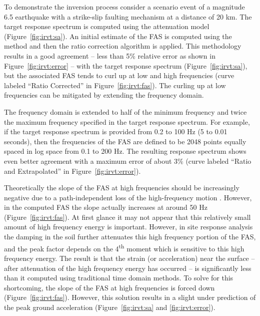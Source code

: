 \documentclass[12pt,oneside]{book}
\begin{document}
To demonstrate the inversion process consider a scenario event of a magnitude 6.5 earthquake with a
strike-slip faulting mechanism at a distance of 20 km.  The target response spectrum is computed
using the \citet{abrahamson:97} attenuation model (Figure~\ref{fig:irvt:sa}).  An initial estimate
of the FAS is computed using the \citet{gasparini:76} method and then the ratio correction algorithm
is applied.  This methodology results in a good agreement -- less than 5\% relative error as shown
in Figure~\ref{fig:irvt:error} -- with the target response spectrum (Figure~\ref{fig:irvt:sa}), but
the associated FAS tends to curl up at low and high frequencies (curve labeled ``Ratio Corrected''
in Figure~\ref{fig:irvt:fas}).  The curling up at low frequencies can be mitigated by extending the
frequency domain.

The frequency domain is extended to half of the minimum frequency and twice the maximum
frequency specified in the target response spectrum.  For example, if the target response spectrum is provided from 0.2 to 100 Hz (5
to 0.01 seconds), then the frequencies of the FAS are defined to be 2048 points equally spaced in log
space from  0.1 to 200 Hz.  The resulting response spectrum shows even better agreement with a
maximum error of about 3\% (curve labeled ``Ratio and Extrapolated'' in Figure~\ref{fig:irvt:error}).

Theoretically the slope of the FAS at high frequencies should be increasingly negative due to a
path-independent loss of the high-frequency motion \citep{boore:03}.  However, in the computed
FAS the slope actually increases at around 50 Hz (Figure~\ref{fig:irvt:fas}).  At first glance it
may not appear that this relatively small amount of high frequency energy is important.  However, in
site response analysis the damping in the soil further attenuates this high frequency portion of the
FAS, and the peak factor depends on the 4\textsuperscript{th} moment which is sensitive to this high
frequency energy.  The result is that the strain (or acceleration) near the surface -- after
attenuation of the high frequency energy has occurred -- is significantly less than it computed
using traditional time domain methods.  To solve for this shortcoming, the slope of the FAS at high
frequencies is forced down (Figure~\ref{fig:irvt:fas}).  However, this solution results in a slight under
prediction of the peak ground acceleration (Figure~\ref{fig:irvt:sa} and \ref{fig:irvt:error}).
\end{document}
